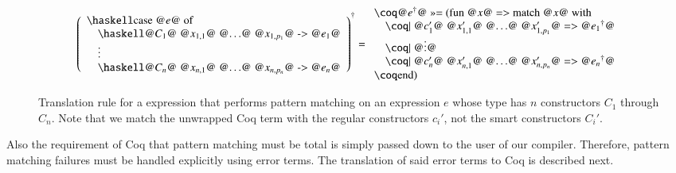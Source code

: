 \begin{figure}[H]
  \[
    \toCoq{\left(
      \begin{array}{l}
        \haskellM{case @$e$@ of}                                                \\
        \quad\haskellM{@$C_1$@ @$x_{1,1}$@ @$\ldots$@ @$x_{1,p_1}$@ -> @$e_1$@} \\
        \quad\vdots                                                             \\
        \quad\haskellM{@$C_n$@ @$x_{n,1}$@ @$\ldots$@ @$x_{n,p_n}$@ -> @$e_n$@}
      \end{array}
    \right)}
    = \begin{array}{l}
      \coqM{@$\toCoqX{e}$@ >>= (fun @$x$@ => match @$x$@ with}                          \\
      \quad\coqM{| @$c_1'$@ @$x_{1,1}'$@ @$\ldots$@ @$x_{1,p_1}'$@ => @$\toCoqX{e_1}$@} \\
      \quad\coqM{| @$\vdots$@}                                                          \\
      \quad\coqM{| @$c_n'$@ @$x_{n,1}'$@ @$\ldots$@ @$x_{n,p_n}'$@ => @$\toCoqX{e_n}$@} \\
      \coqM{end)}
    \end{array}
  \]
  \caption{Translation rule for a  expression that performs pattern matching on an expression $e$ whose type has $n$ constructors $C_1$ through $C_n$. Note that we match the unwrapped Coq term with the regular constructors $c_i'$, not the smart constructors $C_i'$.}
  \label{fig:translation:expr:case}
\end{figure}

Also the requirement of Coq that pattern matching must be total is simply passed down to the user of our compiler.
Therefore, pattern matching failures must be handled explicitly using error terms.
The translation of said error terms to Coq is described next.


